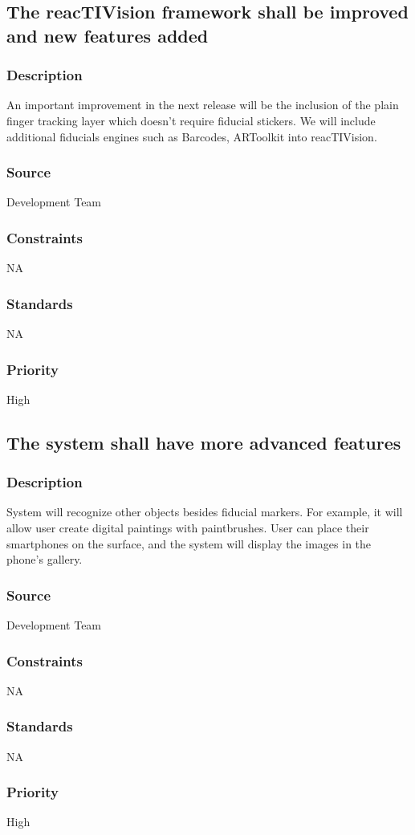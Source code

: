 \subsection{The reacTIVision framework shall be improved and new features added }
\subsubsection{Description}
An important improvement in the next release will be the inclusion of the plain finger tracking layer which doesn't require fiducial stickers. We will include additional fiducials engines such as Barcodes, ARToolkit into reacTIVision.
\subsubsection{Source}
Development Team
\subsubsection{Constraints}
NA
\subsubsection{Standards}
NA
\subsubsection{Priority}
High

\subsection{The system shall have more advanced features }
\subsubsection{Description}
System will recognize other objects besides fiducial markers. For example, it will allow user create digital paintings with paintbrushes. User can place their smartphones on the surface, and the system will display the images in the phone's gallery.
\subsubsection{Source}
Development Team
\subsubsection{Constraints}
NA
\subsubsection{Standards}
NA
\subsubsection{Priority}
High
